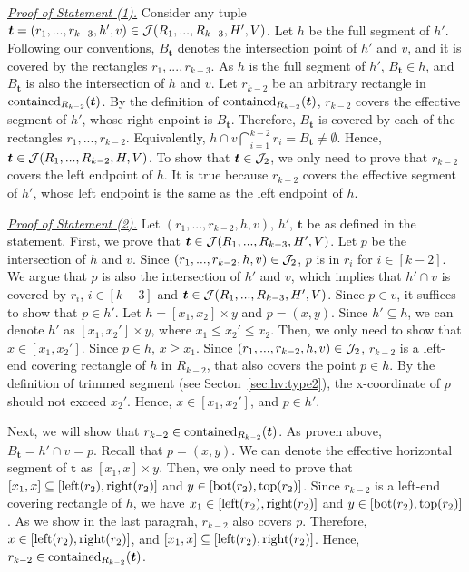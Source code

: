 \noindent \underline{\em Proof of Statement (1).} Consider any tuple $\textrm{\boldmath${t}$} = (r_1,...,r_{k-3}, h', v) \in \mathcal{J}(R_1,...,R_{k-3},H',V)$. Let $h$ be the full segment of $h'$. Following our conventions, $B_\bm{t}$ denotes the intersection point of $h'$ and $v$, and it is covered by the rectangles $r_1,...,r_{k-3}$. As $h$ is the full segment of $h'$, $B_\bm{t} \in h$, and $B_\bm{t}$ is also the intersection of $h$ and $v$. Let $r_{k-2}$ be an arbitrary rectangle in $\mathrm{contained}_{R_{k-2}}(\textrm{\boldmath${t}$})$. By the definition of $\mathrm{contained}_{R_{k-2}}(\textrm{\boldmath${t}$})$, $r_{k-2}$ covers the effective segment of $h'$, whose right enpoint is $B_{\bm{t}}$. Therefore, $B_{\bm{t}}$ is covered by each of the rectangles $r_1,...,r_{k-2}$. Equivalently, $h \cap v \bigcap_{i = 1}^{k-2} r_i = B_\bm{t} \neq \emptyset$. Hence,
$\textrm{\boldmath${t}$} \in \mathcal{J}(R_1,...,R_{k-2},H,V)$. To show that $\textrm{\boldmath${t}$} \in \mathcal{J}_2$, we only need to prove that $r_{k-2}$ covers the left endpoint of $h$. It is true because $r_{k-2}$ covers the effective segment of $h'$, whose left endpoint is the same as the left endpoint of $h$. 

\vgap 

\noindent \underline{\em Proof of Statement (2).} Let $(r_1,...,r_{k-2},h,v)$, $h'$, $\bm{t}$ be as defined in the statement. First, we prove that $\textrm{\boldmath${t}$}\in \mathcal{J}(R_1,...,R_{k-3}, H', V)$.
Let $p$ be the intersection of $h$ and $v$. Since $(r_1,...,r_{k-2},h,v)\in \mathcal{J}_2$, $p$ is in $r_i$ for $i \in [k-2]$.
We argue that $p$ is also the intersection of $h'$ and $v$, which implies that $h'\cap v$ is covered by $r_i$, $i \in [k-3]$ and $\textrm{\boldmath${t}$} \in \mathcal{J}(R_1,...,R_{k-3},H',V)$. Since $p \in v$, it suffices to show that $p \in h'$. Let $h = [x_1,x_2]\times y$ and $p = (x,y)$. Since $h' \subseteq h$, we can denote $h'$ as $[x_1, x_2'] \times y$, where $x_1 \le x_2' \le x_2$. Then, we only need to show that $x \in [x_1, x_2']$. Since $p \in h$, $x \ge x_1$. Since $(r_1,...,r_{k-2},h,v) \in \mathcal{J}_2$, $r_{k-2}$ is a left-end covering rectangle of $h$ in $R_{k-2}$, that also covers the point $p \in h$. By the definition of trimmed segment (see Secton~\ref{sec:hv:type2}), the x-coordinate of $p$ should not exceed $x_2'$. Hence, $x \in [x_1, x_2']$, and $p \in h'$.

\vgap 

Next, we will show that $r_{k-2}\in \mathrm{contained}_{R_{k-2}}(\textrm{\boldmath${t}$})$. As proven above, $B_\bm{t} = h'\cap v = p$. Recall that $p = (x,y)$. We can denote the effective horizontal segment of $\bm{t}$ as $[x_1, x] \times y$. Then, we only need to prove that $[x_1,x] \subseteq [\mathrm{left}(r_2), \mathrm{right}(r_2)]$ and $y \in [\mathrm{bot}(r_2), \mathrm{top}(r_2)]$. Since $r_{k-2}$ is a left-end covering rectangle of $h$, we have  $x_1 \in [\mathrm{left}(r_2), \mathrm{right}(r_2)]$ and $y \in [\mathrm{bot}(r_2), \mathrm{top}(r_2)]$. As we show in the last paragrah, $r_{k-2}$ also covers $p$. Therefore, $x \in [\mathrm{left}(r_2), \mathrm{right}(r_2)]$, and $[x_1,x] \subseteq [\mathrm{left}(r_2), \mathrm{right}(r_2)]$. Hence, $r_{k-2}\in \mathrm{contained}_{R_{k-2}}(\textrm{\boldmath${t}$})$.

